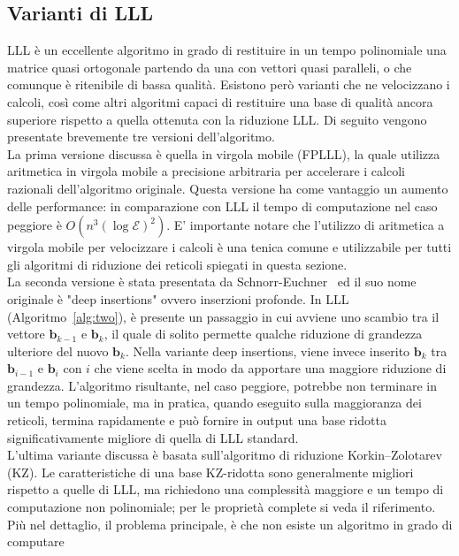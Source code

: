 \subsection{Varianti di LLL}
\label{sec:LLL-variants}
LLL è un eccellente algoritmo in grado di restituire in un tempo polinomiale una matrice 
quasi ortogonale partendo da una con vettori quasi paralleli, o che comunque è ritenibile 
di bassa qualità. Esistono però varianti che ne velocizzano i calcoli, 
così come altri algoritmi capaci di restituire una base di qualità ancora superiore 
rispetto a quella ottenuta con la riduzione LLL. Di seguito vengono presentate 
brevemente tre versioni dell'algoritmo. 
\\
La prima versione discussa è quella in virgola mobile (FPLLL)\cite{FPLLL05}, la quale 
utilizza aritmetica in virgola mobile a 
precisione arbitraria per accelerare i calcoli razionali dell'algoritmo originale. 
Questa versione ha come vantaggio un aumento delle performance: in comparazione con LLL
il tempo di computazione nel caso peggiore è $O(n^3 (\log\mathcal{E})^2)$. E' importante notare che
l'utilizzo di aritmetica a virgola mobile per velocizzare i calcoli è una tenica comune e utilizzabile
per tutti gli algoritmi di riduzione dei reticoli spiegati in questa sezione.
\\ 
La seconda versione è stata presentata da Schnorr-Euchner~\cite{DEEPLLL94} ed il suo nome
originale è "deep insertions" ovvero inserzioni profonde. In LLL (Algoritmo~\ref*{alg:two}),
è presente un passaggio in cui avviene uno scambio tra il vettore 
$\mathbf{b}_{k-1}$ e $\mathbf{b}_{k}$, il quale di solito permette qualche riduzione di grandezza
ulteriore del nuovo $\mathbf{b}_{k}$. Nella variante deep insertions, viene invece inserito
$\mathbf{b}_{k}$ tra $\mathbf{b}_{i-1}$ e $\mathbf{b}_{i}$ con $i$ che viene scelta in modo
da apportare una maggiore riduzione di grandezza. L'algoritmo risultante, nel caso peggiore,
potrebbe non terminare in un tempo polinomiale, ma in pratica, quando eseguito sulla maggioranza
dei reticoli, termina rapidamente e può fornire in output una base ridotta 
significativamente migliore di quella di LLL standard. 
\\
L'ultima variante discussa è basata sull'algoritmo di riduzione 
Korkin–Zolotarev (KZ)\cite[sezione 18.5]{Galbraith18}. Le caratteristiche di una base KZ-ridotta
sono generalmente migliori rispetto a quelle di LLL, ma richiedono una complessità maggiore
e un tempo di computazione non polinomiale; per le proprietà complete si veda il riferimento. 
Più nel dettaglio, il problema principale, è che non esiste un algoritmo in grado di computare
